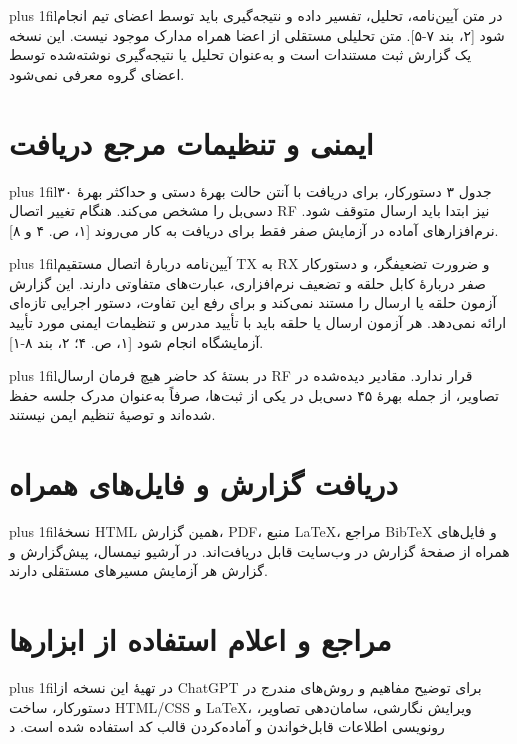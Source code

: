 \documentclass[10pt,a4paper]{article}
\newcommand{\rtl}[1]{\beginR #1\endR}
\newcommand{\rp}[1]{\par\begingroup\rightskip=0pt\leftskip=0pt plus 1fil\parfillskip=0pt\noindent\beginR #1\endR\par\endgroup}
\begin{document}
\rp{در متن آیین‌نامه، تحلیل، تفسیر داده و نتیجه‌گیری باید توسط اعضای تیم انجام شود [۲، بند ۷-۵]. متن تحلیلی مستقلی از اعضا همراه مدارک موجود نیست. این نسخه یک گزارش ثبت مستندات است و به‌عنوان تحلیل یا نتیجه‌گیری نوشته‌شده توسط اعضای گروه معرفی نمی‌شود.}

\section{\rtl{ایمنی و تنظیمات مرجع دریافت}}
\rp{جدول ۳ دستورکار، برای دریافت با آنتن حالت بهرهٔ دستی و حداکثر بهرهٔ ۳۰ دسی‌بل را مشخص می‌کند. هنگام تغییر اتصال RF نیز ابتدا باید ارسال متوقف شود. نرم‌افزارهای آماده در آزمایش صفر فقط برای دریافت به کار می‌روند [۱، ص. ۴ و ۸].}

\rp{آیین‌نامه دربارهٔ اتصال مستقیم TX به RX و ضرورت تضعیفگر، و دستورکار صفر دربارهٔ کابل حلقه و تضعیف نرم‌افزاری، عبارت‌های متفاوتی دارند. این گزارش آزمون حلقه یا ارسال را مستند نمی‌کند و برای رفع این تفاوت، دستور اجرایی تازه‌ای ارائه نمی‌دهد. هر آزمون ارسال یا حلقه باید با تأیید مدرس و تنظیمات ایمنی مورد تأیید آزمایشگاه انجام شود [۱، ص. ۴؛ ۲، بند ۸-۱].}

\rp{در بستهٔ کد حاضر هیچ فرمان ارسال RF قرار ندارد. مقادیر دیده‌شده در تصاویر، از جمله بهرهٔ ۴۵ دسی‌بل در یکی از ثبت‌ها، صرفاً به‌عنوان مدرک جلسه حفظ شده‌اند و توصیهٔ تنظیم ایمن نیستند.}

\section{\rtl{دریافت گزارش و فایل‌های همراه}}
\rp{نسخهٔ HTML همین گزارش، PDF، منبع LaTeX، مراجع BibTeX و فایل‌های همراه از صفحهٔ گزارش در وب‌سایت قابل دریافت‌اند. در آرشیو نیمسال، پیش‌گزارش و گزارش هر آزمایش مسیرهای مستقلی دارند.}

\section{\rtl{مراجع و اعلام استفاده از ابزارها}}
\rp{در تهیهٔ این نسخه از ChatGPT برای توضیح مفاهیم و روش‌های مندرج در دستورکار، ساخت HTML/CSS و LaTeX، ویرایش نگارشی، سامان‌دهی تصاویر، رونویسی اطلاعات قابل‌خواندن و آماده‌کردن قالب کد استفاده شده است. د}

\nocite{labmanual,regulations}
\end{document}
